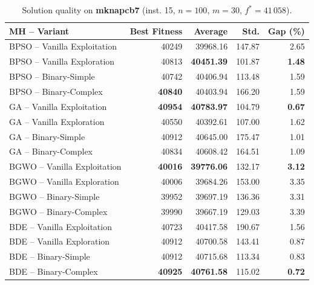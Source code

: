 \begin{table}[htbp]
  \centering
  \small
  \caption{Solution quality on \textbf{mknapcb7} (inst. 15, $n=100$, $m=30$, $f^*=41\,058$).}
  \label{tab:calidad_mknapcb7_15}
  \begin{tabular}{lrrrr}
    \toprule
    \textbf{MH -- Variant} &
    \textbf{Best Fitness} &
    \textbf{Average} &
    \textbf{Std.} &
    \textbf{Gap (\%)} \\
    \midrule
    BPSO -- Vanilla Exploitation &          40249 &         39968.16 & 147.87 &         2.65 \\
    BPSO -- Vanilla Exploration  &          40813 & \textbf{40451.39} & 101.87 & \textbf{1.48} \\
    BPSO -- Binary-Simple        &          40742 &         40406.94 & 113.48 &         1.59 \\
    BPSO -- Binary-Complex       & \textbf{40840} &         40403.94 & 166.20 &         1.59 \\
    \midrule
    GA -- Vanilla Exploitation   & \textbf{40954} & \textbf{40783.97} & 104.79 & \textbf{0.67} \\
    GA -- Vanilla Exploration    &          40550 &         40392.61 & 107.00 &         1.62 \\
    GA -- Binary-Simple          &          40912 &         40645.00 & 175.47 &         1.01 \\
    GA -- Binary-Complex         &          40834 &         40608.42 & 164.51 &         1.09 \\
    \midrule
    BGWO -- Vanilla Exploitation & \textbf{40016} & \textbf{39776.06} & 132.17 & \textbf{3.12} \\
    BGWO -- Vanilla Exploration  &          40006 &         39684.26 & 153.00 &         3.35 \\
    BGWO -- Binary-Simple        &          39952 &         39697.19 & 136.36 &         3.31 \\
    BGWO -- Binary-Complex       &          39990 &         39667.19 & 129.03 &         3.39 \\
    \midrule
    BDE -- Vanilla Exploitation  &          40723 &         40417.58 & 190.67 &         1.56 \\
    BDE -- Vanilla Exploration   &          40912 &         40700.58 & 143.41 &         0.87 \\
    BDE -- Binary-Simple         &          40912 &         40715.68 & 113.34 &         0.83 \\
    BDE -- Binary-Complex        & \textbf{40925} & \textbf{40761.58} & 115.02 & \textbf{0.72} \\
    \bottomrule
  \end{tabular}
\end{table}
